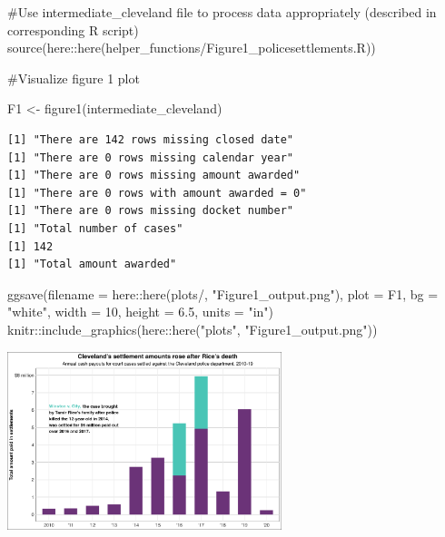\documentclass[
  letterpaper,
  DIV=11,
  numbers=noendperiod]{scrartcl}
\newenvironment{Shaded}{\begin{snugshade}}{\end{snugshade}}
\newcommand{\AttributeTok}[1]{\textcolor[rgb]{0.40,0.45,0.13}{#1}}
\newcommand{\CommentTok}[1]{\textcolor[rgb]{0.37,0.37,0.37}{#1}}
\newcommand{\DecValTok}[1]{\textcolor[rgb]{0.68,0.00,0.00}{#1}}
\newcommand{\FloatTok}[1]{\textcolor[rgb]{0.68,0.00,0.00}{#1}}
\newcommand{\FunctionTok}[1]{\textcolor[rgb]{0.28,0.35,0.67}{#1}}
\newcommand{\NormalTok}[1]{\textcolor[rgb]{0.00,0.23,0.31}{#1}}
\newcommand{\OtherTok}[1]{\textcolor[rgb]{0.00,0.23,0.31}{#1}}
\newcommand{\SpecialCharTok}[1]{\textcolor[rgb]{0.37,0.37,0.37}{#1}}
\newcommand{\StringTok}[1]{\textcolor[rgb]{0.13,0.47,0.30}{#1}}
\begin{document}
\begin{Shaded}
\begin{Highlighting}[]
\CommentTok{\#Use intermediate\_cleveland file to process data appropriately (described in corresponding R script)}
\FunctionTok{source}\NormalTok{(here}\SpecialCharTok{::}\FunctionTok{here}\NormalTok{(}\StringTok{\textquotesingle{}helper\_functions/Figure1\_policesettlements.R\textquotesingle{}}\NormalTok{))}

\CommentTok{\#Visualize figure 1 plot }

\NormalTok{F1 }\OtherTok{\textless{}{-}} \FunctionTok{figure1}\NormalTok{(intermediate\_cleveland)}
\end{Highlighting}
\end{Shaded}

\begin{verbatim}
[1] "There are 142 rows missing closed date"
[1] "There are 0 rows missing calendar year"
[1] "There are 0 rows missing amount awarded"
[1] "There are 0 rows with amount awarded = 0"
[1] "There are 0 rows missing docket number"
[1] "Total number of cases"
[1] 142
[1] "Total amount awarded"
\end{verbatim}

\begin{Shaded}
\begin{Highlighting}[]
\FunctionTok{ggsave}\NormalTok{(}\AttributeTok{filename =}\NormalTok{ here}\SpecialCharTok{::}\FunctionTok{here}\NormalTok{(}\StringTok{\textquotesingle{}plots/\textquotesingle{}}\NormalTok{, }\StringTok{"Figure1\_output.png"}\NormalTok{), }
       \AttributeTok{plot =}\NormalTok{ F1, }
       \AttributeTok{bg =} \StringTok{"white"}\NormalTok{, }\AttributeTok{width =} \DecValTok{10}\NormalTok{, }\AttributeTok{height =} \FloatTok{6.5}\NormalTok{, }\AttributeTok{units =} \StringTok{"in"}\NormalTok{)}
\NormalTok{knitr}\SpecialCharTok{::}\FunctionTok{include\_graphics}\NormalTok{(here}\SpecialCharTok{::}\FunctionTok{here}\NormalTok{(}\StringTok{"plots"}\NormalTok{, }\StringTok{"Figure1\_output.png"}\NormalTok{))}
\end{Highlighting}
\end{Shaded}

\includegraphics[width=0.6\textwidth,height=\textheight]{plots/Figure1_output.png}
\end{document}
